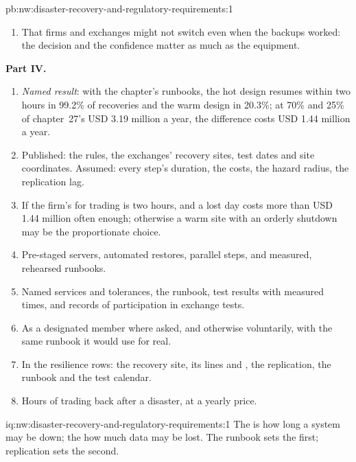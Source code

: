 \begin{solution}{pb:nw:disaster-recovery-and-regulatory-requirements:1}
\begin{enumerate}[resume]
\item That firms and exchanges might not switch even when the backups worked: the decision and the confidence matter as much as the
  equipment.
\end{enumerate}
\textbf{Part IV.}
\begin{enumerate}[resume]
\item \emph{Named result}: with the chapter's runbooks, the hot design resumes within two hours in 99.2\% of recoveries and the warm design
  in 20.3\%; at 70\% and 25\% of chapter~27's USD 3.19 million a year, the difference costs USD 1.44 million a year.
\item Published: the rules, the exchanges' recovery sites, test dates and site coordinates. Assumed: every step's duration, the costs, the
  hazard radius, the replication lag.
\item If the firm's  for trading is two hours, and a lost day costs more than USD 1.44 million often enough; otherwise a warm
  site with an orderly shutdown may be the proportionate choice.
\item Pre-staged servers, automated restores, parallel steps, and measured, rehearsed runbooks.
\item Named services and tolerances, the runbook, test results with measured times, and records of participation in exchange tests.
\item As a designated member where asked, and otherwise voluntarily, with the same runbook it would use for real.
\item In the resilience rows: the recovery site, its lines and , the replication, the runbook and the test calendar.
\item Hours of trading back after a disaster, at a yearly price.
\end{enumerate}
\end{solution}

\begin{solution}{iq:nw:disaster-recovery-and-regulatory-requirements:1}
The  is how long a system may be down; the  how much data may be lost. The runbook sets the
first; replication sets the second.
\end{solution}

